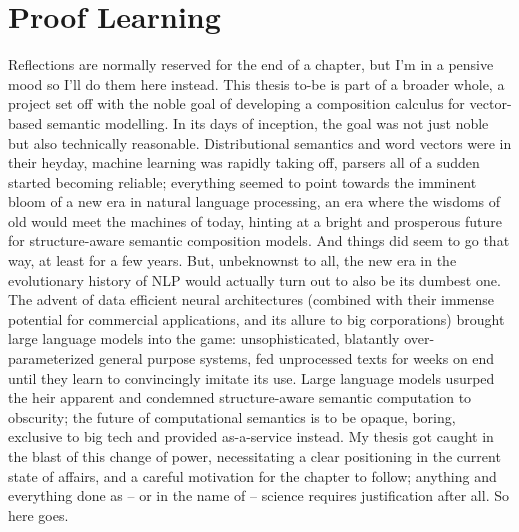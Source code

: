 \chapter{Proof Learning}
\label{chapter:chapter_4}


\chapabstract{\todo}


Reflections are normally reserved for the end of a chapter, but I'm in a pensive mood so I'll do them here instead.
This thesis to-be is part of a broader whole, a project set off with the noble goal of developing a composition calculus for vector-based semantic modelling.
In its days of inception, the goal was not just noble but also technically reasonable.
Distributional semantics and word vectors were in their heyday, machine learning was rapidly taking off, parsers all of a sudden started becoming reliable; everything seemed to point towards the imminent bloom of a new era in natural language processing, an era where the wisdoms of old would meet the machines of today, hinting at a bright and prosperous future for structure-aware semantic composition models.
And things did seem to go that way, at least for a few years.
But, unbeknownst to all, the new era in the evolutionary history of NLP would actually turn out to also be its dumbest one.
The advent of data efficient neural architectures (combined with their immense potential for commercial applications, and its allure to big corporations) brought large language models into the game: unsophisticated, blatantly over-parameterized general purpose systems, fed unprocessed texts for weeks on end until they learn to convincingly imitate its use.
Large language models usurped the heir apparent and condemned structure-aware semantic computation to obscurity; the future of computational semantics is to be opaque, boring, exclusive to big tech and provided as-a-service instead.
My thesis got caught in the blast of this change of power, necessitating a clear positioning in the current state of affairs, and a careful motivation for the chapter to follow; anything and everything done as -- or in the name of -- science requires justification after all.
So here goes.

